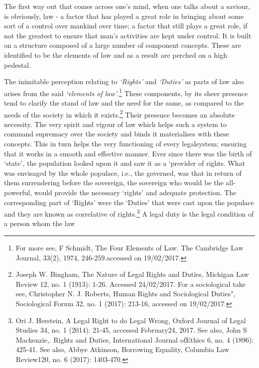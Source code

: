 \begin{multicols}{2}
\vspace{-.15cm}

\noi
The first way out that comes across one’s mind, when one talks about a saviour, is obviously, law - a factor that has played a great role in bringing about some sort of a control over mankind over time; a factor that still plays a great role, if not the greatest to ensure that man’s activities are kept under control. It is built on a structure composed of a large number of component concepts. These are identified to be the elements of law and as a result are perched on a high pedestal.


\vspace{-.15cm}

\noi
The inimitable perception relating to \textit{‘Rights’} and \textit{‘Duties’} as parts of law also arises from the said \textit{‘elements of law’}.\footnote{For more see, F Schmidt, The Four Elements of Law. The Cambridge Law Journal, 33(2), 1974, 246-259.accessed on 19/02/2017.} These components, by its sheer presence tend to clarify the stand of law and the need for the same, as compared to the needs of the society in which it exists.\footnote{Joseph W. Bingham, The Nature of Legal Rights and Duties, Michigan Law Review 12, no. 1 (1913): 1-26. Accessed 24/02/2017. For a sociological take see, Christopher N. J. Roberts, Human Rights and Sociological Duties", Sociological Forum 32, no. 1 (2017): 213-16, accessed on 19/02/2017.} Their presence becomes an absolute necessity. The very spirit and vigour of law which helps such a system to command supremacy over the society and binds it materialises with these concepts. This in turn helps the very functioning of every legalsystem; ensuring that it works in a smooth
and effective manner. Ever since there was the birth of ‘state’, the population looked upon it
and saw it as a ‘provider of rights. What was envisaged by the whole populace, i.e., the
governed, was that in return of them surrendering before the sovereign, the sovereign who
would be the all-powerful, would provide the necessary ‘rights’ and adequate protection. The
corresponding part of ‘Rights’ were the ‘Duties’ that were cast upon the populace and they are
known as correlative of rights.\footnote{Ori J. Herstein, A Legal Right to do Legal Wrong, Oxford Journal of Legal Studies 34, no. 1 (2014): 21-45, accessed February24, 2017. See also, John S Mackenzie,. Rights and Duties, International Journal ofEthics 6, no. 4 (1896): 425-41. See also, Abbye Atkinson, Borrowing Equality, Columbia Law Review120, no. 6 (2017): 1403-470.} A legal duty is the legal condition of a person whom the law

\end{multicols}
